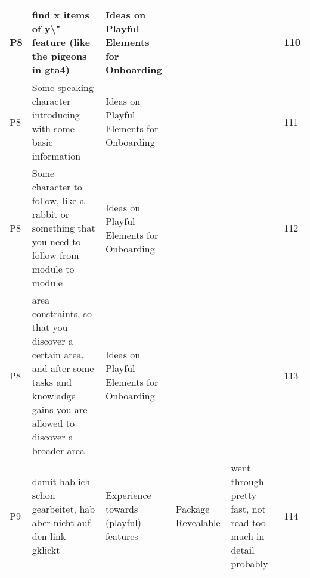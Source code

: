 \begin{appendices}
\begin{landscape}
\begin{longtable}{|p{0.8cm}|p{7cm}|p{3cm}|p{3cm}|p{5.5cm}|p{0.5cm}|}
      P8                   & find x items of y\textbackslash{}" feature (like the pigeons in gta4)                                                                                                                                                                                                       & Ideas on Playful Elements for Onboarding &                                    &                                                                                                                                                    & 110          \\ \hline
      P8                   & Some speaking character introducing with some basic information                                                                                                                                                                                                             & Ideas on Playful Elements for Onboarding &                                    &                                                                                                                                                    & 111          \\ \hline
      P8                   & Some character to follow, like a rabbit or something that you need to follow from module to module                                                                                                                                                                          & Ideas on Playful Elements for Onboarding &                                    &                                                                                                                                                    & 112          \\ \hline
      P8                   & area constraints, so that you discover a certain area, and after some tasks and knowladge gains you are allowed to discover a broader area                                                                                                                                  & Ideas on Playful Elements for Onboarding &                                    &                                                                                                                                                    & 113          \\ \hline
      P9                   & damit hab ich schon gearbeitet, hab aber nicht auf den link gklickt                                                                                                                                                                                                         & Experience towards (playful) features    & Package Revealable                 & went through pretty fast, not read too much in detail probably                                                                                     & 114          \\ \hline

\end{longtable}
\end{landscape}
\end{appendices}
